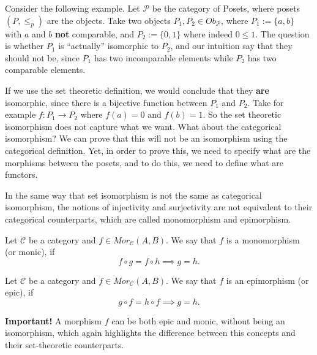 Consider the following example.
Let $\mathcal P$ be the category of Posets, where posets $(P,\leq_p)$ are the objects.
Take two objects $P_1, P_2 \in Ob_\mathcal P$,
where $P_1:=\{a,b\}$ with $a$ and $b$ \textbf{not} comparable,
and $P_2:=\{0,1\}$ where indeed $0 \leq 1$. The question is whether $P_1$ is ``actually'' isomorphic
to $P_2$, and our intuition say that they should not be, since 
$P_1$ has two incomparable elements while $P_2$ has two comparable elements.

If we use the set theoretic definition, we would conclude that they \textbf{are} isomorphic,
since there is a bijective function between $P_1$ and $P_2$. 
Take for example $f:P_1\to P_2$ where $f(a)=0$ and $f(b)=1$.
So the set theoretic isomorphism does not capture what we want. What about the categorical isomorphism?
We can prove that this will not be an isomorphism using the categorical definition. Yet,
in order to prove this, we need to specify what are the morphisms between the posets,
and to do this, we need to define what are functors.

In the same way that set isomorphism is not the same as categorical isomorphism,
the notions of injectivity and surjectivity are not equivalent to their categorical
counterparts, which are called monomorphism and epimorphism.

\begin{definition}[Monomorphism]
  Let $\mathcal C$ be a category and $f \in Mor_\mathcal C(A,B)$. We say that
  $f$ is a monomorphism (or monic), if
  \begin{displaymath}
    f \circ g = f \circ h \implies g = h.  
  \end{displaymath}
\end{definition}

\begin{definition}[Epimorphism]
  Let $\mathcal C$ be a category and $f \in Mor_\mathcal C(A,B)$. We say that
  $f$ is an epimorphism (or epic), if
  \begin{displaymath}
    g \circ f = h \circ f \implies g = h.
  \end{displaymath}
\end{definition}
\textbf{Important!} A morphism $f$ can be both epic and monic, without being
an isomorphism, which again highlights the difference between this concepts and their
set-theoretic counterparts.

